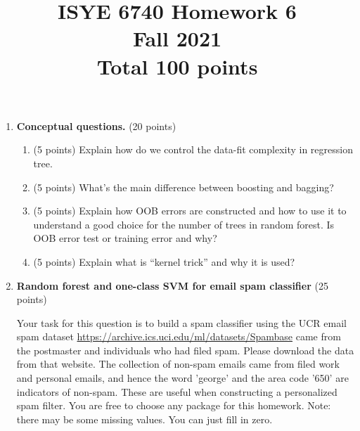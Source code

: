 \documentclass[twoside,10pt]{article}
\begin{document}
\title{ISYE 6740 Homework 6\\ 
Fall 2021\\ 
\small Total 100 points}
\date{}
\maketitle






\begin{enumerate}


\item {\bf Conceptual questions.} (20 points)

\begin{enumerate}

\item (5 points) Explain how do we control the data-fit complexity in regression tree.

\item (5 points) What's the main difference between boosting and bagging?

\item (5 points) Explain how OOB errors are constructed and how to use it to understand a good choice for the number of trees in random forest. Is OOB error test or training error and why?

\item (5 points) Explain what is ``kernel trick'' and why it is used?

\end{enumerate}


\item {\bf Random forest and one-class SVM for email spam classifier} (25 points)

Your task for this question is to build a spam classifier using the UCR email spam dataset \url{https://archive.ics.uci.edu/ml/datasets/Spambase} came from the postmaster and individuals who had filed spam. Please download the data from that website. The collection of non-spam emails came from filed work and personal emails, and hence the word \textsf{'george'} and the area code \textsf{'650'} are indicators of non-spam. These are useful when constructing a personalized spam filter. You are free to choose any package for this homework. Note: there may be some missing values. You can just fill in zero.


\end{enumerate}
\end{document}
